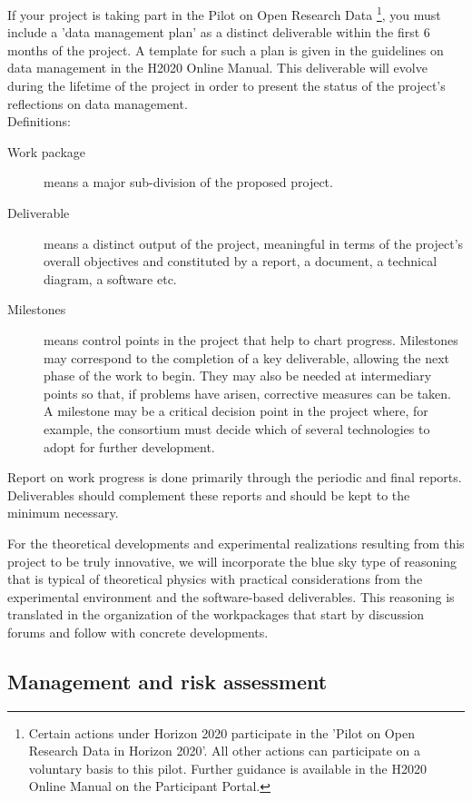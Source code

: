 {%
If your project is taking part in the Pilot on Open Research Data%
\footnote{%
  Certain actions under Horizon 2020 participate in the 'Pilot on Open Research
  Data in Horizon 2020'. All other actions can participate on a voluntary basis
  to this pilot. Further guidance is available in the H2020 Online Manual on the
  Participant Portal.},
you must include a 'data management plan' as a distinct deliverable within the
first 6 months of the project. A template for such a plan is given in the
guidelines on data management in the H2020 Online Manual. This deliverable will
evolve during the lifetime of the project in order to present the status of the
project's reflections on data management.\\
%
Definitions:
\begin{description}
\item[Work package] means a major sub-division of the proposed project.
\item[Deliverable] means a distinct output of the project, meaningful in terms of the project's overall
  objectives and constituted by a report, a document, a technical diagram, a software etc.
\item[Milestones] means control points in the project that help to chart progress. Milestones
    may correspond to the completion of a key deliverable, allowing the next phase of the
    work to begin. They may also be needed at intermediary points so that, if problems have
    arisen, corrective measures can be taken. A milestone may be a critical decision point in
    the project where, for example, the consortium must decide which of several technologies
    to adopt for further development.
\end{description}
%
Report on work progress is done primarily through the periodic and final reports. Deliverables
should complement these reports and should be kept to the minimum necessary.
}

For the theoretical developments and experimental realizations resulting from
this project to be truly innovative, we will incorporate the blue sky type of
reasoning that is typical of theoretical physics with practical considerations
from the experimental environment and the software-based deliverables.
%
This reasoning is translated in the organization of the workpackages that start
by discussion forums and follow with concrete developments.

\subsection{Management and risk assessment}

